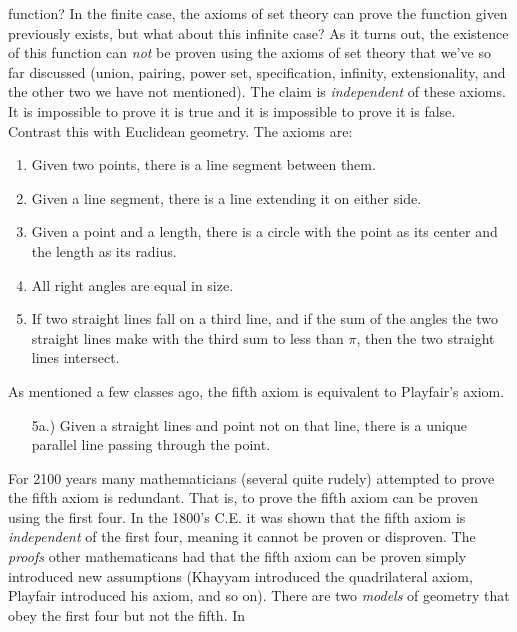 \documentclass{article}
\theoremstyle{plain}
\theoremstyle{normal}
\begin{document}
        function? In the finite case, the axioms of set theory can prove the
        function given previously exists, but what about this infinite case?
        As it turns out, the existence of this function can \textit{not} be
        proven using the axioms of set theory that we've so far discussed
        (union, pairing, power set, specification, infinity, extensionality,
        and the other two we have not mentioned). The claim is
        \textit{independent} of these axioms. It is impossible to prove it is
        true and it is impossible to prove it is false. Contrast this with
        Euclidean geometry. The axioms are:
        \begin{enumerate}
            \item Given two points, there is a line segment between them.
            \item Given a line segment, there is a line extending it on either side.
            \item Given a point and a length, there is a circle with the point as
                its center and the length as its radius.
            \item All right angles are equal in size.
            \item If two straight lines fall on a third line, and if the
                sum of the angles the two straight lines make with the third
                sum to less than $\pi$, then the two straight lines intersect.
        \end{enumerate}
        As mentioned a few classes ago, the fifth axiom is equivalent to
        Playfair's axiom.
        \begin{enumerate}
            \item[5a.)] Given a straight lines and point not on that line,
                there is a unique parallel line passing through the point.
        \end{enumerate}
        For 2100 years many mathematicians (several quite rudely) attempted to
        prove the fifth axiom is redundant. That is, to prove the fifth axiom
        can be proven using the first four. In the 1800's C.E. it was shown that
        the fifth axiom is \textit{independent} of the first four, meaning it
        cannot be proven or disproven. The \textit{proofs} other mathematicans
        had that the fifth axiom can be proven simply introduced new
        assumptions (Khayyam introduced the quadrilateral axiom, Playfair
        introduced his axiom, and so on). There are two \textit{models} of
        geometry that obey the first four but not the fifth. In
\end{document}
